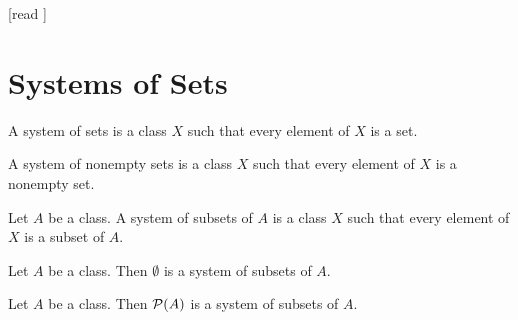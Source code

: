 \documentclass[10pt]{article}
\begin{document}
  \begin{imports}
    \begin{forthel}
      [read ]
    \end{forthel}
  \end{imports}


  \section*{Systems of Sets}

  \begin{forthel}
    \begin{definition}[id=FOUNDATIONS_10_5805323570905088,printid]
      A system of sets is a class $X$ such that every element of $X$ is a set.
    \end{definition}
  \end{forthel}

  \begin{forthel}
    \begin{definition}[id=FOUNDATIONS_10_1631952387964928,printid]
      A system of nonempty sets is a class $X$ such that every element of $X$ is a nonempty set.
    \end{definition}
  \end{forthel}

  \begin{forthel}
    \begin{definition}[id=FOUNDATIONS_10_943381479948288,printid]
      Let $A$ be a class.
      A system of subsets of $A$ is a class $X$ such that every element of $X$ is a subset of $A$.
    \end{definition}
  \end{forthel}

  \begin{forthel}
    \begin{proposition}[id=FOUNDATIONS_10_8268633648136192,printid]
      Let $A$ be a class.
      Then $\emptyset$ is a system of subsets of $A$.
    \end{proposition}
  \end{forthel}

  \begin{forthel}
    \begin{proposition}[id=FOUNDATIONS_10_7546016869908480,printid]
      Let $A$ be a class.
      Then $\mathcal{P}(A)$ is a system of subsets of $A$.
    \end{proposition}
  \end{forthel}
\end{document}
